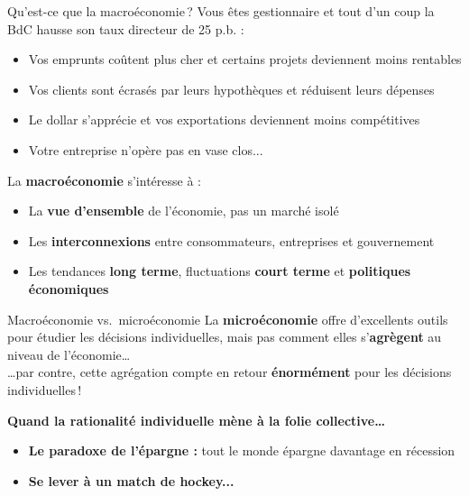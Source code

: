 \documentclass[aspectratio=169]{beamer}
\begin{document}
\begin{frame}[t]{Qu'est-ce que la macroéconomie\,?}
   \small
   Vous êtes gestionnaire et tout d'un coup la BdC hausse son taux directeur de 25 p.b. :
   \vspace{0.1cm}
   \begin{itemize}
      \setlength\itemsep{0.1cm}
      \item Vos emprunts coûtent plus cher et certains projets deviennent moins rentables
      \item Vos clients sont écrasés par leurs hypothèques et réduisent leurs dépenses
      \item Le dollar s'apprécie et vos exportations deviennent moins compétitives
      \item Votre entreprise n'opère pas en vase clos...
   \end{itemize}
   \vspace{0.15cm}
   La \textbf{macroéconomie} s'intéresse à :
   \vspace{0.15cm}
   \begin{itemize}
      \setlength\itemsep{0.15cm}
      \item La \textbf{vue d'ensemble} de l'économie, pas un marché isolé
      \item Les \textbf{interconnexions} entre consommateurs, entreprises et gouvernement
      \item Les tendances \textbf{long terme}, fluctuations \textbf{court terme} et \textbf{politiques économiques}
   \end{itemize}
\end{frame}

\begin{frame}{Macroéconomie vs.\ microéconomie}
   La \textbf{microéconomie} offre d'excellents outils pour étudier les décisions individuelles, mais pas comment elles s'\textbf{agrègent} au niveau de l'économie\ldots
   \\[6pt]
   \ldots par contre, cette agrégation compte en retour \textbf{énormément} pour les décisions individuelles\,!
   \vspace{0.5cm}

   \textbf{Quand la rationalité individuelle mène à la folie collective\ldots}
   \vspace{0.2cm}
   \begin{itemize}
      \setlength\itemsep{0.2cm}
      \item \textbf{Le paradoxe de l'épargne :} tout le monde épargne davantage en récession
      \item \textbf{Se lever à un match de hockey...}
   \end{itemize}
\end{frame}
\end{document}
